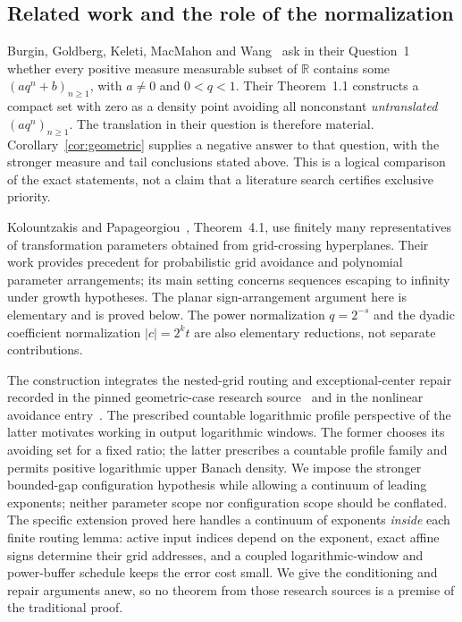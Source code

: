 \documentclass[11pt]{article}
\theoremstyle{definition}
\theoremstyle{remark}
\newcommand{\R}{\mathbb R}
\begin{document}
\subsection{Related work and the role of the normalization}
Burgin, Goldberg, Keleti, MacMahon and Wang~\cite{BGKMW} ask in their
Question~1 whether every positive measure measurable subset of $\R$ contains
some $(a q^n+b)_{n\geq1}$, with $a\ne0$ and $0<q<1$. Their Theorem~1.1
constructs a compact set with zero as a density point avoiding all nonconstant
\emph{untranslated} $(a q^n)_{n\geq1}$. The translation in their question is
therefore material. Corollary~\ref{cor:geometric} supplies a negative answer to
that question, with the stronger measure and tail conclusions stated above.
This is a logical comparison of the exact statements, not a claim that a
literature search certifies exclusive priority.

Kolountzakis and Papageorgiou~\cite{KP}, Theorem~4.1, use finitely many
representatives of transformation parameters obtained from grid-crossing
hyperplanes. Their work provides precedent for probabilistic grid avoidance
and polynomial parameter arrangements; its main setting concerns sequences
escaping to infinity under growth hypotheses. The planar sign-arrangement
argument here is elementary and is proved below. The power normalization
$q=2^{-s}$ and the dyadic coefficient normalization $|c|=2^k t$ are also
elementary reductions, not separate contributions.

The construction integrates the nested-grid routing and exceptional-center
repair recorded in the pinned geometric-case research source~\cite{Routing}
and in the nonlinear avoidance entry~\cite{Profiles}. The prescribed countable
logarithmic profile perspective of the latter motivates working in output
logarithmic windows. The former chooses its avoiding set for a fixed ratio;
the latter prescribes a countable profile family and permits positive
logarithmic upper Banach density. We impose the stronger bounded-gap
configuration hypothesis while allowing a continuum of leading exponents;
neither parameter scope nor configuration scope should be conflated.
The specific extension proved here handles a continuum
of exponents \emph{inside} each finite routing lemma: active input indices
depend on the exponent, exact affine signs determine their grid addresses,
and a coupled logarithmic-window and power-buffer schedule keeps the error
cost small. We give the conditioning and repair arguments anew, so no theorem
from those research sources is a premise of the traditional proof.
\end{document}
